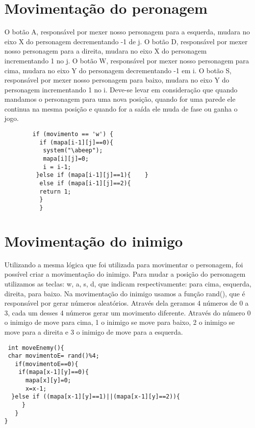 \documentclass[journal]{IEEEtran}
\begin{document}
\section{Movimentação do peronagem}
O botão A, responsável por mexer nosso personagem para a esquerda, mudara no eixo X do personagem decrementando -1 de j. O botão D, responsável por mexer nosso personagem para a direita, mudara no eixo X do personagem incrementando 1 no j. O botão W, responsável por mexer nosso personagem para cima, mudara no eixo Y do personagem decrementando -1 em i. O botão S, responsável por mexer nosso personagem para baixo, mudara no eixo Y do personagem  incrementando 1 no i. Deve-se levar em consideração que quando mandamos o personagem para uma nova posição, quando for uma parede ele continua na mesma posição e quando for a saída ele muda de fase ou ganha o jogo. 

\begin{lstlisting}  
        if (movimento == 'w') {  
          if (mapa[i-1][j]==0){ 
           system("\abeep"); 
           mapa[i][j]=0; 
           i = i-1; 
         }else if (mapa[i-1][j]==1){    } 
          else if (mapa[i-1][j]==2){ 
          return 1;
          }
          }
          \end{lstlisting}
\section{Movimentação do inimigo}
Utilizando a mesma lógica que foi utilizada para movimentar o personagem, foi possível criar a movimentação do inimigo. Para mudar a posição do personagem utilizamos as teclas: w, a, s, d, que indicam respectivamente: para cima, esquerda, direita, para baixo. Na movimentação do inimigo usamos a função rand(), que é responsável por gerar números aleatórios. Através dela geramos 4 números de 0 a 3, cada um desses 4 números gerar um movimento diferente. Através do número 0 o inimigo de move para cima, 1 o inimigo se move para baixo, 2 o inimigo se move para a direita e 3 o inimigo de move para a esquerda. 

\begin{lstlisting}  
 int moveEnemy(){
 char movimentoE= rand()%4;
   if(movimentoE==0){
    if(mapa[x-1][y]==0){
      mapa[x][y]=0;
      x=x-1;
  }else if ((mapa[x-1][y]==1)||(mapa[x-1][y]==2)){
     }
   }
}
         \end{lstlisting}
         
\end{document}
